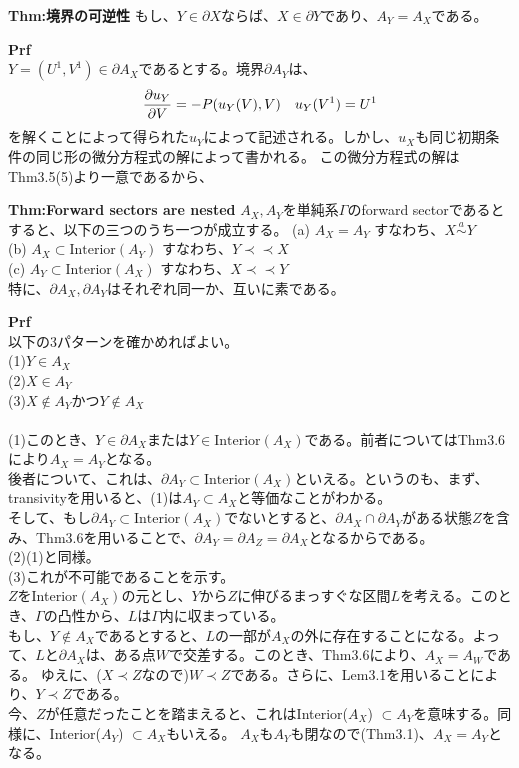 \documentclass[a4paper,11pt]{jsarticle}
\begin{document}
\begin{itembox}[l]{\textbf{Thm:境界の可逆性}}
もし、$Y \in \partial X$ならば、$X \in \partial Y$であり、$A_Y = A_X$である。\\
\end{itembox}
\textbf{Prf}\\
$Y =(U^1,V^1)\in \partial A_X$であるとする。境界$\partial A_Y$は、
\begin{align}
    \pdv{u_Y}{V}(V) = -P(u_Y(V),V) \quad  u_Y(V^1) =U^1
\end{align}
を解くことによって得られた$u_Y$によって記述される。しかし、$u_X$も同じ初期条件の同じ形の微分方程式の解によって書かれる。
この微分方程式の解はThm3.5(5)より一意であるから、

\begin{itembox}[l]{\textbf{Thm:Forward sectors are nested}}
    $A_X,A_Y$を単純系$\Gamma$のforward sectorであるとすると、以下の三つのうち一つが成立する。
    (a) $A_X=A_Y$ すなわち、$X \overset{a}{\sim} Y$\\
    (b) $A_X \subset \text{Interior}(A_Y)$ すなわち、$Y \prec \prec X$\\
    (c) $A_Y \subset \text{Interior}(A_X)$ すなわち、$X \prec \prec Y$\\
    特に、$\partial A_X, \partial A_Y$はそれぞれ同一か、互いに素である。

\end{itembox}
\textbf{Prf}\\
以下の3パターンを確かめればよい。\\
(1)$Y \in A_X$\\
(2)$X \in A_Y$\\
(3)$X \notin A_Y$かつ$Y \notin A_X$\\
\\
(1)このとき、$Y \in \partial A_X$または$Y \in \text{Interior}(A_X)$である。前者についてはThm3.6により$A_X=A_Y$となる。\\
後者について、これは、$\partial A_Y \subset \text{Interior}(A_X)$といえる。というのも、まず、transivityを用いると、(1)は$A_Y \subset A_X$と等価なことがわかる。\\
そして、もし$\partial A_Y \subset \text{Interior}(A_X)$でないとすると、$\partial A_X \cap \partial A_Y$がある状態$Z$を含み、Thm3.6を用いることで、$\partial A_Y =\partial A_Z =\partial A_X $となるからである。\\
(2)(1)と同様。\\
(3)これが不可能であることを示す。\\
$Z$をInterior$(A_X)$の元とし、$Y$から$Z$に伸びるまっすぐな区間$L$を考える。このとき、$\Gamma$の凸性から、$L$は$\Gamma$内に収まっている。\\
もし、$Y \notin A_X$であるとすると、$L$の一部が$A_X$の外に存在することになる。よって、$L$と$\partial A_X$は、ある点$W$で交差する。このとき、Thm3.6により、$A_X=A_W$である。
ゆえに、($X \prec Z$なので)$W \prec Z$である。さらに、Lem3.1を用いることにより、$Y \prec Z$である。\\
今、$Z$が任意だったことを踏まえると、これはInterior($A_X$) $\subset A_Y$を意味する。同様に、Interior($A_Y$) $\subset A_X$もいえる。
$A_X$も$A_Y$も閉なので(Thm3.1)、$A_X =A_Y$となる。 \hfill \qedsymbol\\
\end{document}

